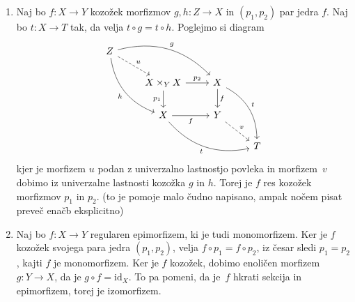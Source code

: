 \documentclass[../kategoricna_logika.tex]{subfiles}
\begin{document}
\begin{dokaz}
  \begin{enumerate}[label=(\roman*)]
  \item %
    Naj bo $f : X \to Y$ kozožek morfizmov $g,h : Z \to X$ in
    $(p_1, p_2)$ par jedra $f$.  Naj bo $t : X \to T$ tak, da velja
    $t \circ g = t \circ h$. Poglejmo si diagram
    \begin{equation*}
      \begin{tikzcd}[row sep=normal, column sep=normal]
        Z \ar[ddr, bend right, "h"'] \ar[dr, dashed, "u"] \ar[drr, bend left, "g"] & & & \\
        & X \times_Y X \ar[d, "p_1"'] \ar[r, "p_2"] & X \ar[d, "f"] \ar[ddr, bend left, "t"] & \\
        & X \ar[r, "f"'] \ar[drr, bend right, "t"'] & Y \ar[dr, dashed, "v"] & \\
        & & & T
      \end{tikzcd}
    \end{equation*}
    kjer je morfizem $u$ podan z univerzalno lastnostjo povleka in
    morfizem~$v$ dobimo iz univerzalne lastnosti kozožka $g$ in $h$.
    Torej je $f$ res kozožek morfizmov $p_1$ in $p_2$.  (to je pomoje
    malo čudno napisano, ampak nočem pisat preveč enačb eksplicitno)

  \item %
    Naj bo $f : X \to Y$ regularen epimorfizem, ki je tudi
    monomorfizem.  Ker je $f$ kozožek svojega para jedra $(p_1, p_2)$,
    velja $f \circ p_1 = f \circ p_2$, iz česar sledi $p_1 = p_2$,
    kajti $f$ je monomorfizem.  Ker je $f$ kozožek, dobimo enoličen
    morfizem $g : Y \to X$, da je $g \circ f = \mathrm{id}_X$.  To pa
    pomeni, da je~$f$ hkrati sekcija in epimorfizem, torej je
    izomorfizem.


\end{enumerate}
\end{dokaz}
\end{document}
